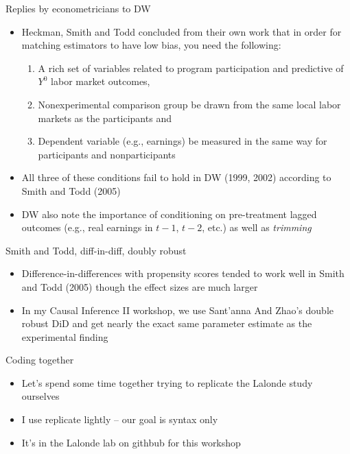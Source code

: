 \documentclass{beamer}
\begin{document}



\clearpage
\newpage

\begin{frame}{Replies by econometricians to DW}

\begin{itemize}
\item Heckman, Smith and Todd concluded from their own work that in order for matching estimators to have low bias, you need the following:
	\begin{enumerate}
	\item A rich set of variables related to program participation and predictive of $Y^0$ labor market outcomes, 
	\item Nonexperimental comparison group be drawn from the same local labor markets as the participants and 
	\item Dependent variable (e.g., earnings) be measured in the same way for participants and nonparticipants
	\end{enumerate}
\item All three of these conditions fail to hold in DW (1999, 2002) according to Smith and Todd (2005)
\item DW also note the importance of conditioning on pre-treatment lagged outcomes (e.g., real earnings in $t-1$, $t-2$, etc.) as well as \emph{trimming}
\end{itemize}

\end{frame}


\begin{frame}{Smith and Todd, diff-in-diff, doubly robust}

\begin{itemize}
\item Difference-in-differences with propensity scores tended to work well in Smith and Todd (2005) though the effect sizes are much larger
\item In my Causal Inference II workshop, we use Sant'anna And Zhao's double robust DiD and get nearly the exact same parameter estimate as the experimental finding

\end{itemize}

\end{frame}

\begin{frame}{Coding together}

\begin{itemize}

\item Let's spend some time together trying to replicate the Lalonde study ourselves
\item I use replicate lightly -- our goal is syntax only
\item It's in the Lalonde lab on githbub for this workshop

\end{itemize}

\end{frame}
\end{document}
